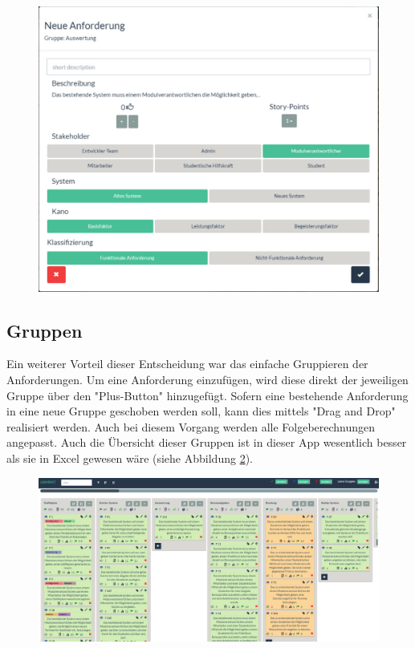 \begin{figure}[!htb]
		\includegraphics[width=.5\textwidth]{images/erstellen.pdf}
\centering 
{} 
		\label{fig:erstellen}
\end{figure}


\subsection{Gruppen}
Ein weiterer Vorteil dieser Entscheidung war das einfache Gruppieren der Anforderungen. Um eine Anforderung einzufügen, wird diese direkt der jeweiligen Gruppe über den "Plus-Button" hinzugefügt. Sofern eine bestehende Anforderung in eine neue Gruppe geschoben werden soll, kann dies mittels "Drag and Drop" realisiert werden. Auch bei diesem Vorgang werden alle Folgeberechnungen angepasst. Auch die Übersicht dieser Gruppen ist in dieser App wesentlich besser als sie in Excel gewesen wäre (siehe Abbildung \ref{fig:gruppen}).

\begin{figure}[!htb]
		\includegraphics[width=\textwidth]{images/webseite.pdf}
\centering 
{} 
\label{fig:gruppen}
\end{figure}



